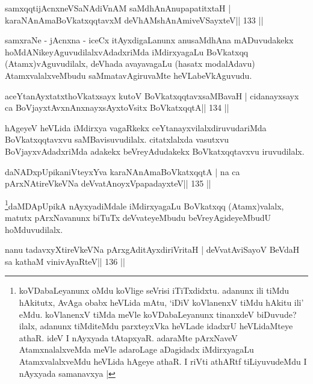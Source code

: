 
\begin{shl}
samxqqtijAcnxneVSaNAdiVnAM saMdhAnAnupapatitxtaH |
karaNAnAmaBoVkatxqqtavxM deVhAMshAnAmiveVSayxteV\hfill || 133 ||
\end{shl}

\begin{artha}
samxraNe - jAcnxna - iceCx itAyxdigaLanunx anusaMdhAna mADuvudakekx hoMdANike\-yAguvudilalxvAdadxriMda iMdirxyagaLu BoVkatxqq (Atamx)vAguvudilalx, deVhada avayavagaLu (hasatx modalAdavu) AtamxvalalxveMbudu saMmatavAgiruvaMte heVLabeVkAguvudu.
\end{artha}

\begin{shl}
aceYtanAyxtatxthoVkatxsayx kutoV BoVkatxqqtavxsaMBavaH |
cidanayxsayx ca BoVjayxtAvxnAnxnayxsAyxtoV\s sitx BoVkatxqqtA\hfill || 134 ||
\end{shl}

\begin{artha}
hAgeyeV heVLida iMdirxya vagaRkekx ceYtanayxvilalxdiruvudariMda  BoVkatxqqtavxvu saMBavisuvudilalx. citatxlalxda vasutxvu BoVjayxvAdadxriMda adakekx beVreyAdudakekx BoVkatxqqtavxvu iruvudilalx.
\end{artha}

\begin{shl}
daNADxpUpikaniVteyxYva karaNAnAmaBoVkatxqqtA |
na ca pArxNAtireVkeVNa deVvatA\s noyxVpapadayxteV\hfill || 135 ||
\end{shl}

\begin{artha}
\footnote{koVDabaLeyanunx oMdu koVlige seVrisi iTiTxdidxtu. adanunx ili  tiMdu hAkitutx, AvAga obabx heVLida mAtu, `iDiV koVlanenxV tiMdu hAkitu  ili' eMdu. koVlanenxV tiMda meVle koVDabaLeyanunx tinanxdeV biDuvude?  ilalx, adanunx tiMditeMdu parxteyxVka heVLade idadxrU heVLidaMteye athaR. ideV I nAyxyada tAtapxyaR. adaraMte pArxNaveV AtamxnalalxveMda meVle adaroLage aDagidadx  iMdirxyagaLu AtamxvalalxveMdu heVLida hAgeye athaR. I riVti athARtf tiLiyuvudeMdu I nAyxyada samanavxya |}daMDApUpikA nAyxyadiMdale iMdirxyagaLu BoVkatxqq (Atamx)valalx, matutx pArxNavanunx biTuTx deVvateyeMbudu beVreyAgideyeMbudU hoMduvudilalx.
\end{artha}


\begin{shl}
nanu tadavxyXtireVkeVNa pArxgAditAyxdiriVritaH |
deVvatAviSayoV BeVdaH sa kathaM vinivAyaRteV\hfill || 136 ||
\end{shl}

